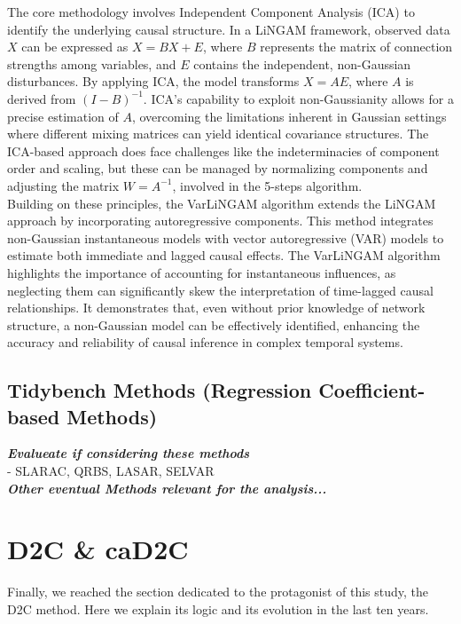 The core methodology involves Independent Component Analysis (ICA) to identify the underlying causal structure. In a LiNGAM framework, observed data $X$ can be expressed as $X = BX + E$, where $B$ represents the matrix of connection strengths among variables, and $E$ contains the independent, non-Gaussian disturbances. By applying ICA, the model transforms $X = AE$, where $A$ is derived from $(I-B)^{-1}$. ICA's capability to exploit non-Gaussianity allows for a precise estimation of $A$, overcoming the limitations inherent in Gaussian settings where different mixing matrices can yield identical covariance structures. The ICA-based approach does face challenges like the indeterminacies of component order and scaling, but these can be managed by normalizing components and adjusting the matrix $W = A^{-1}$, involved in the 5-steps algorithm. \cite{shimizu2006linear}\\

Building on these principles, the VarLiNGAM algorithm extends the LiNGAM approach by incorporating autoregressive components. This method integrates non-Gaussian instantaneous models with vector autoregressive (VAR) models to estimate both immediate and lagged causal effects. The VarLiNGAM algorithm highlights the importance of accounting for instantaneous influences, as neglecting them can significantly skew the interpretation of time-lagged causal relationships. It demonstrates that, even without prior knowledge of network structure, a non-Gaussian model can be effectively identified, enhancing the accuracy and reliability of causal inference in complex temporal systems. \cite{hasan2023survey}


\subsection{Tidybench Methods (Regression Coefficient-based Methods)}
\textit{\textbf{Evalueate if considering these methods}}\\
- SLARAC, QRBS, LASAR, SELVAR\\

\textit{\textbf{Other eventual Methods relevant for the analysis...}}

\section{D2C \& caD2C}
Finally, we reached the section dedicated to the protagonist of this study, the D2C method. Here we explain its logic and its evolution in the last ten years.\\

